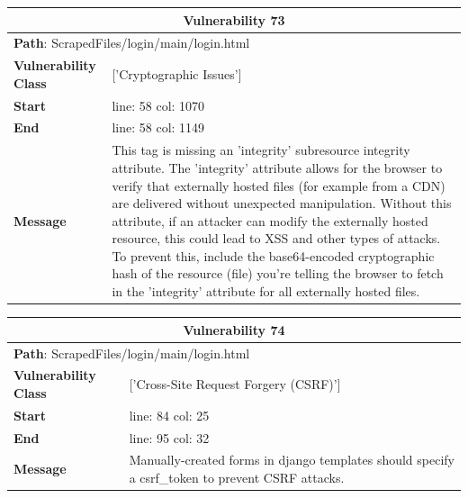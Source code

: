 \documentclass[12pt]{article}
\begin{document}
\FloatBarrier
\begin{table}[!h]
\centering
\renewcommand{\arraystretch}{1.3}
\begin{tabular}{|l|p{10cm}|}
\hline
\multicolumn{2}{|c|}{\textbf{Vulnerability 73}} \\
\hline
\multicolumn{2}{|l|}{\textbf{Path}: ScrapedFiles/login/main/login.html} \\
\hline
\textbf{Vulnerability Class} & ['Cryptographic Issues'] \\
\hline
\textbf{Start} & line: 58 \quad col: 1070 \\
\hline
\textbf{End} & line: 58 \quad col: 1149 \\
\hline
\textbf{Message} & This tag is missing an 'integrity' subresource integrity attribute. The 'integrity' attribute allows for the browser to verify that externally hosted files (for example from a CDN) are delivered without unexpected manipulation. Without this attribute, if an attacker can modify the externally hosted resource, this could lead to XSS and other types of attacks. To prevent this, include the base64-encoded cryptographic hash of the resource (file) you're telling the browser to fetch in the 'integrity' attribute for all externally hosted files. \\
\hline
\end{tabular}
\end{table}
\vspace{0.7cm}
\FloatBarrier
\begin{table}[!h]
\centering
\renewcommand{\arraystretch}{1.3}
\begin{tabular}{|l|p{10cm}|}
\hline
\multicolumn{2}{|c|}{\textbf{Vulnerability 74}} \\
\hline
\multicolumn{2}{|l|}{\textbf{Path}: ScrapedFiles/login/main/login.html} \\
\hline
\textbf{Vulnerability Class} & ['Cross-Site Request Forgery (CSRF)'] \\
\hline
\textbf{Start} & line: 84 \quad col: 25 \\
\hline
\textbf{End} & line: 95 \quad col: 32 \\
\hline
\textbf{Message} & Manually-created forms in django templates should specify a csrf\_token to prevent CSRF attacks. \\
\hline
\end{tabular}
\end{table}
\vspace{0.7cm}
\FloatBarrier
\end{document}
